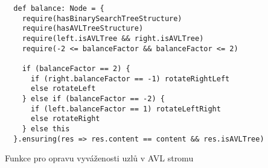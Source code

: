 \begin{listing}[H]
  \begin{verbatim}
  def balance: Node = {
    require(hasBinarySearchTreeStructure)
    require(hasAVLTreeStructure)
    require(left.isAVLTree && right.isAVLTree)
    require(-2 <= balanceFactor && balanceFactor <= 2)

    if (balanceFactor == 2) {
      if (right.balanceFactor == -1) rotateRightLeft
      else rotateLeft
    } else if (balanceFactor == -2) {
      if (left.balanceFactor == 1) rotateLeftRight
      else rotateRight
    } else this
  }.ensuring(res => res.content == content && res.isAVLTree)
  \end{verbatim}
  \caption{Funkce pro opravu vyváženosti uzlů v AVL stromu}
  \label{lst:stainless-avl-balance}
\end{listing}

